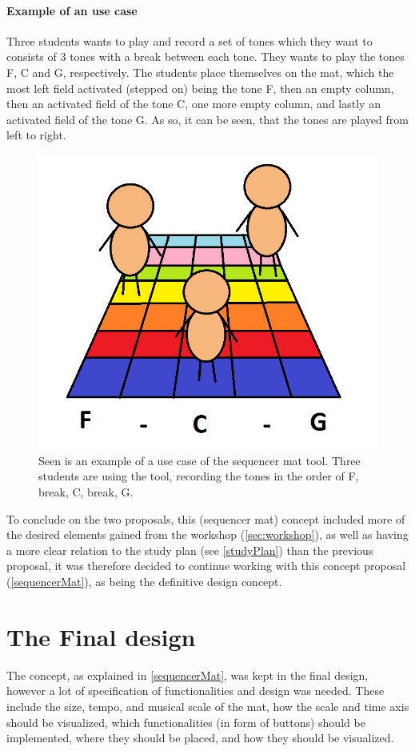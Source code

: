 \paragraph{Example of an use case}
Three students wants to play and record a set of tones which they want to consists of 3 tones with a break between each tone. They wants to play the tones F, C and G, respectively. The students place themselves on the mat, which the most left field activated (stepped on) being the tone F, then an empty column, then an activated field of the tone C, one more empty column, and lastly an activated field of the tone G. As so, it can be seen, that the tones are played from left to right.   
\begin{figure}[H]
	\centering
	\includegraphics[width=0.7\linewidth]{figure/Design/UseCase} 
	\caption{Seen is an example of a use case of the sequencer mat tool. Three students are using the tool, recording the tones in the order of F, break, C, break, G. }
	\label{fig:UseCase2}
\end{figure}
  

To conclude on the two proposals, this (sequencer mat) concept included more of the desired elements gained from the workshop (\autoref{sec:workshop}), as well as having a more clear relation to the study plan (see \autoref{studyPlan}) than the previous proposal,
it was therefore decided to continue working with this concept proposal (\autoref{sequencerMat}), as being the definitive design concept. 

\section{The Final design}\label{designConcept}
The concept, as explained in \autoref{sequencerMat}, was kept in the final design, however a lot of specification of functionalities and design was needed. These include the size, tempo, and musical scale of the mat, how the scale and time axis should be visualized, which functionalities (in form of buttons) should be implemented, where they should be placed, and how they should be visualized. 


